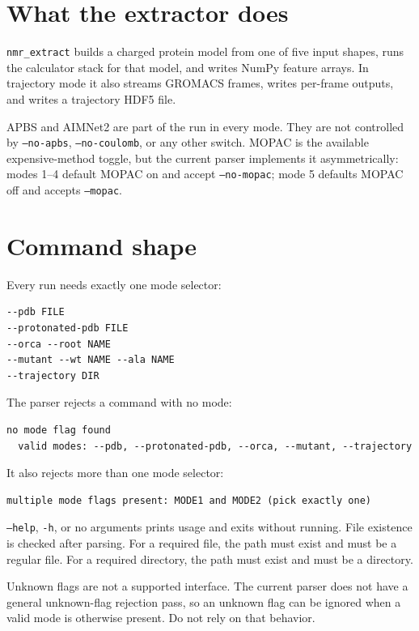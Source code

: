 \documentclass[11pt]{article}
\begin{document}

\section{What the extractor does}

\texttt{nmr\_extract} builds a charged protein model from one of five input
shapes, runs the calculator stack for that model, and writes NumPy feature
arrays. In trajectory mode it also streams GROMACS frames, writes per-frame
outputs, and writes a trajectory HDF5 file.

APBS and AIMNet2 are part of the run in every mode. They are not controlled by
\texttt{--no-apbs}, \texttt{--no-coulomb}, or any other switch. MOPAC is the
available expensive-method toggle, but the current parser implements it
asymmetrically: modes 1--4 default MOPAC on and accept
\texttt{--no-mopac}; mode 5 defaults MOPAC off and accepts \texttt{--mopac}.

\section{Command shape}

Every run needs exactly one mode selector:

\begin{lstlisting}
--pdb FILE
--protonated-pdb FILE
--orca --root NAME
--mutant --wt NAME --ala NAME
--trajectory DIR
\end{lstlisting}

The parser rejects a command with no mode:

\begin{lstlisting}
no mode flag found
  valid modes: --pdb, --protonated-pdb, --orca, --mutant, --trajectory
\end{lstlisting}

It also rejects more than one mode selector:

\begin{lstlisting}
multiple mode flags present: MODE1 and MODE2 (pick exactly one)
\end{lstlisting}

\texttt{--help}, \texttt{-h}, or no arguments prints usage and exits without
running. File existence is checked after parsing. For a required file, the path
must exist and must be a regular file. For a required directory, the path must
exist and must be a directory.

Unknown flags are not a supported interface. The current parser does not have
a general unknown-flag rejection pass, so an unknown flag can be ignored when a
valid mode is otherwise present. Do not rely on that behavior.
\end{document}
